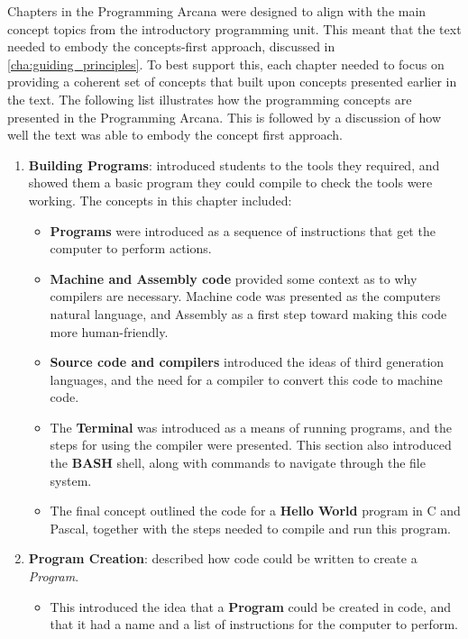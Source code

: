 Chapters in the Programming Arcana were designed to align with the main concept topics from the introductory programming unit. This meant that the text needed to embody the concepts-first approach,  discussed in \cref{cha:guiding_principles}. To best support this, each chapter needed to focus on providing a coherent set of concepts that built upon concepts presented earlier in the text. The following list illustrates how the programming concepts are presented in the Programming Arcana. This is followed by a discussion of how well the text was able to embody the concept first approach.

\begin{enumerate}
  \item \textbf{Building Programs}: introduced students to the tools they required, and showed them a basic program they could compile to check the tools were working. The concepts in this chapter included: 
  \begin{itemize}[noitemsep,nolistsep]
    \item \textbf{Programs} were introduced as a sequence of instructions that get the computer to perform actions.
    \item \textbf{Machine and Assembly code} provided some context as to why compilers are necessary. Machine code was presented as the computers natural language, and Assembly as a first step toward making this code more human-friendly.
    \item \textbf{Source code and compilers} introduced the ideas of third generation languages, and the need for a compiler to convert this code to machine code.
    \item The \textbf{Terminal} was introduced as a means of running programs, and the steps for using the compiler were presented. This section also introduced the \textbf{BASH} shell, along with commands to navigate through the file system. 
    \item The final concept outlined the code for a \textbf{Hello World} program in C and Pascal, together with the steps needed to compile and run this program. 
  \end{itemize}
  \item \textbf{Program Creation}: described how code could be written to create a \emph{Program}.
  \begin{itemize}[noitemsep,nolistsep]
    \item This introduced the idea that a \textbf{Program} could be created in code, and that it had a name and a list of instructions for the computer to perform.

\end{itemize}
\end{enumerate}
